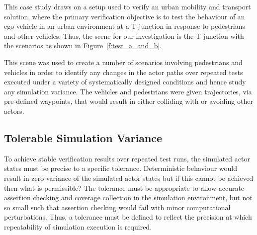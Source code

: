 \documentclass[runningheads,twocolumn,a4paper,10pt]{llncs}
\begin{document}
This case study draws on a setup used to verify an urban mobility and transport solution, where the primary verification objective is to test the behaviour of an ego vehicle in an urban environment at a T-junction in response to pedestrians and other vehicles.
%
Thus, the scene for our investigation is the T-junction with the scenarios as shown in Figure~\ref{f:test_a_and_b}.

This scene was used to create a number of scenarios involving pedestrians and vehicles in order to identify any changes in the actor paths over repeated tests executed under a variety of systematically designed conditions and hence study any simulation variance.
%
The vehicles and pedestrians were given trajectories, via pre-defined waypoints, that would result in either colliding with or avoiding other actors.





\subsection{Tolerable Simulation Variance}\label{s:tolerance}



To achieve stable verification results over repeated test runs, the simulated actor states must be precise to a specific tolerance.
%
Deterministic behaviour would result in zero variance of the simulated actor states but if this cannot be achieved then what is permissible?
%
%
The tolerance must be appropriate to allow accurate assertion checking and coverage collection in the simulation environment, but not so small such that assertion checking would fail with minor computational perturbations. 
%
Thus, a tolerance must be defined to reflect the precision at which repeatability of simulation execution is required. 
\end{document}
